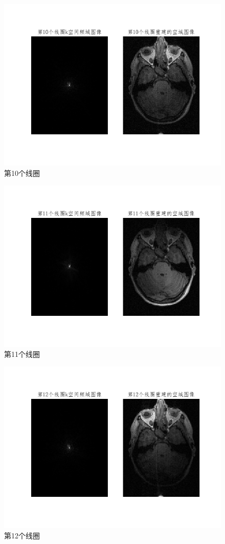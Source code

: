 \begin{figure}[H]
    \centering
    \includegraphics[width=0.6\linewidth]{fig/coil10.png}
    \caption{第10个线圈}
    \label{fig:coil10}
\end{figure}


\begin{figure}[H]
    \centering
    \includegraphics[width=0.6\linewidth]{fig/coil11.png}
    \caption{第11个线圈}
    \label{fig:coil11}
\end{figure}


\begin{figure}[H]
    \centering
    \includegraphics[width=0.6\linewidth]{fig/coil12.png}
    \caption{第12个线圈}
    \label{fig:coil12}
\end{figure}



